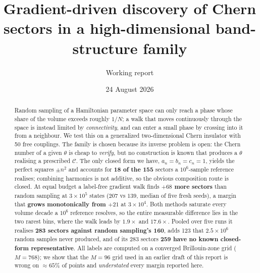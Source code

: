 \documentclass[11pt]{article}
\title{\vspace{-1.6cm}Gradient-driven discovery of Chern sectors in a
high-dimensional band-structure family}
\author{Working report}
\date{24 August 2026}
\newcommand{\good}[1]{\textcolor{blue!70!black}{\textbf{#1}}}
\begin{document}
\maketitle
\vspace{-0.7cm}

\begin{abstract}\noindent
Random sampling of a Hamiltonian parameter space can only reach a phase whose
share of the volume exceeds roughly $1/N$; a walk that moves continuously
through the space is instead limited by \emph{connectivity}, and can enter a
small phase by crossing into it from a neighbour. We test this on a generalized
two-dimensional Chern insulator with 50 free couplings. The family is chosen
because its inverse problem is open: the Chern number of a given $\theta$ is
cheap to \emph{verify}, but no construction is known that produces a $\theta$
realising a prescribed $\mathcal{C}$. The only closed form we have,
$a_n=b_n=c_n=1$, yields the perfect squares $\pm n^2$ and accounts for
\good{18 of the 155} sectors a $10^6$-sample reference realises; combining
harmonics is not additive, so the obvious composition route is closed. At
equal budget a label-free gradient walk finds \good{$+68$ more sectors} than
random sampling at $3\times10^5$ states ($207$ vs $139$, median of five fresh
seeds), a margin that \good{grows monotonically from $+21$} at $3\times10^4$.
Both methods saturate every volume decade a $10^6$ reference resolves, so the
entire measurable difference lies in the two rarest bins, where the walk leads
by $1.9\times$ and \good{$17.6\times$}. Pooled over five runs it realises
\good{283 sectors against random sampling's 160}, adds 123 that
$2.5\times10^{6}$ random samples never produced, and of its 283 sectors
\good{259 have no known closed-form representative}. All labels are computed on
a converged Brillouin-zone grid ($M=768$); we show that the $M=96$ grid used in
an earlier draft of this report is wrong on $\approx65\%$ of points and
\emph{understated} every margin reported here.
\end{abstract}
\end{document}
